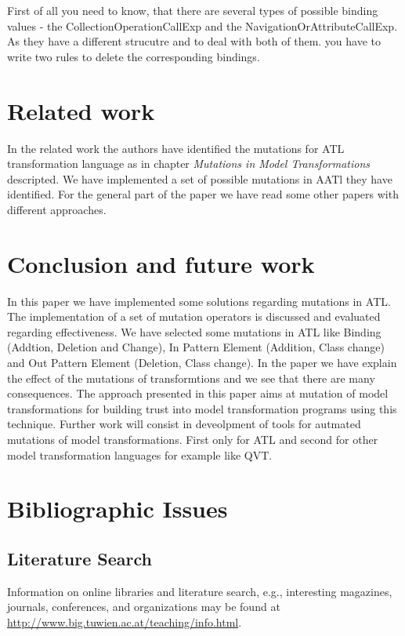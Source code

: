 \documentclass{llncs}
\begin{document}
First of all you need to know, that there are several types of possible binding values - the CollectionOperationCallExp and the NavigationOrAttributeCallExp.
As they have a different strucutre and to deal with both of them. you have to write two rules to delete the corresponding bindings.

\section{Related work}
In the related work \cite{troya:2015} the authors have identified the mutations for ATL transformation language as in chapter \textit{Mutations in Model Transformations} descripted. We have implemented a set of possible mutations in AATl they have identified. For the general part of the paper we have read some other papers with different approaches.

\section{Conclusion and future work}
In this paper we have implemented some solutions regarding mutations in ATL. The implementation of a set of mutation operators is discussed and evaluated regarding effectiveness. We have selected some mutations in ATL like Binding (Addtion, Deletion and Change), In Pattern Element (Addition, Class change) and Out Pattern Element (Deletion, Class change). In the paper we have explain the effect of the mutations of transformtions and we see that there are many consequences. The approach presented in this paper aims at mutation of model transformations for building trust into model transformation programs using this technique. Further work will consist in deveolpment of tools for autmated mutations of model transformations. First only for ATL and second for other model transformation languages for example like QVT.

\section{Bibliographic Issues}

\subsection{Literature Search}

Information on online libraries and literature search, e.g., interesting magazines, journals, conferences, and organizations may be found at \url{http://www.big.tuwien.ac.at/teaching/info.html}.
\end{document}
